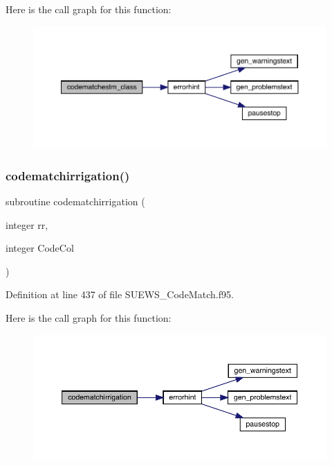 Here is the call graph for this function\+:\nopagebreak
\begin{figure}[H]
\begin{center}
\leavevmode
\includegraphics[width=350pt]{_s_u_e_w_s___code_match_8f95_a63ba5e040a6e29f1f36d27ca207f02ae_cgraph}
\end{center}
\end{figure}
\mbox{\label{_s_u_e_w_s___code_match_8f95_a12555b3358f6f448544804f70ba4a8d7}} 
\subsubsection{\texorpdfstring{codematchirrigation()}{codematchirrigation()}}
{\footnotesize\ttfamily subroutine codematchirrigation (\begin{DoxyParamCaption}\item[{integer}]{rr,  }\item[{integer}]{Code\+Col }\end{DoxyParamCaption})}



Definition at line 437 of file S\+U\+E\+W\+S\+\_\+\+Code\+Match.\+f95.

Here is the call graph for this function\+:\nopagebreak
\begin{figure}[H]
\begin{center}
\leavevmode
\includegraphics[width=350pt]{_s_u_e_w_s___code_match_8f95_a12555b3358f6f448544804f70ba4a8d7_cgraph}
\end{center}
\end{figure}
\mbox{\label{_s_u_e_w_s___code_match_8f95_a368250cd24c62a2bf3f524dbca0b1da4}} 
